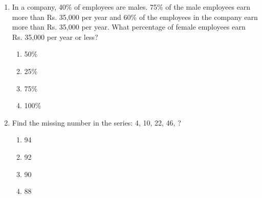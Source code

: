 \documentclass[a4paper,10pt]{article}
\begin{document}
\begin{enumerate}
    \item In a company, 40\% of employees are males. 75\% of the male employees earn more than Rs. 35,000 per year and 60\% of the employees in the company earn more than Rs. 35,000 per year. What percentage of female employees earn Rs. 35,000 per year or less?
    \begin{multicols}{4}
    \begin{enumerate}
        \item 50\%
        \item 25\%
        \item 75\%
        \item 100\%
    \end{enumerate}
    \end{multicols}

    \item Find the missing number in the series: 4, 10, 22, 46, ?
    \begin{multicols}{4}
    \begin{enumerate}
        \item 94
        \item 92
        \item 90
        \item 88
    \end{enumerate}
    \end{multicols}
\end{enumerate}
\end{document}
